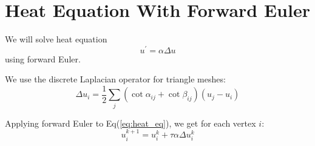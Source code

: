 \documentclass{article}
\begin{document}
\section*{Heat Equation With Forward Euler}
We will solve heat equation 
\begin{equation} \label{eq:heat_eq}
u^{\prime} = \alpha \Delta u
\end{equation}
using forward Euler. 

We use the discrete Laplacian operator for triangle meshes:
\begin{equation} \label{eq:discrete_laplacian_op}
\Delta u_i = \frac{1}{2}\sum_{j} (\cot{\alpha_{ij}} + \cot{\beta_{ij}})(u_j - u_i)
\end{equation}

Applying forward Euler to Eq(\ref{eq:heat_eq}), we get for each vertex $i$:
\begin{equation} \label{eq:update_rule}
u_i^{k+1} = u_i^{k} + \tau \alpha \Delta u_i^{k}
\end{equation}

%
%
\end{document}

